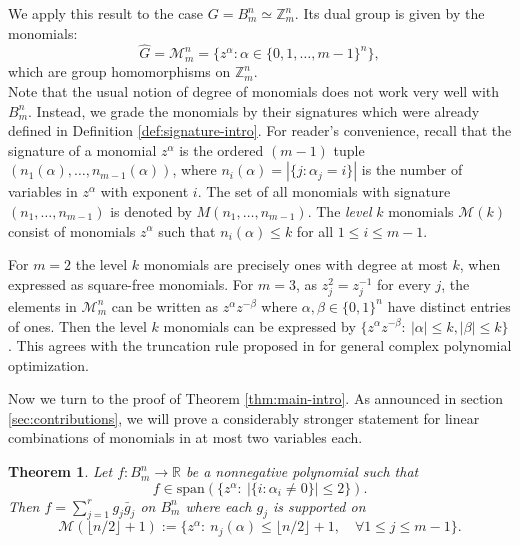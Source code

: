 \documentclass{article}
\newcommand{\ZZ}{\mathbb{Z}}
\newcommand{\RR}{\mathbb{R}}
\newtheorem{theorem}{Theorem}
\theoremstyle{definition}
\newcommand{\Mon}{\mathcal{M}}
\newcommand{\kMon}[1]{\mathcal{M}(#1)}
\begin{document}
We apply this result to the case $G=B_m^n\simeq \ZZ_m^n$. Its dual group is given by the monomials:
$$\hat{G} = \Mon_m^n =\{z^\alpha: \alpha \in \{0,1,\dots,m-1\}^n\},$$ 
which are group homomorphisms on $\ZZ_m^n$. \\
Note that the usual notion of degree of monomials does not work very well with $B_m^n$. Instead, we grade the monomials by their signatures which were already defined in Definition \ref{def:signature-intro}. For reader's convenience, recall that the signature of a monomial $z^\alpha$ is the ordered $(m-1)$ tuple $(n_1(\alpha),\ldots,n_{m-1}(\alpha))$, where $n_i(\alpha)=|\{j:\alpha_j=i\}|$ is the number of variables in $z^\alpha$ with exponent $i$. The set of all monomials with signature $(n_1,\ldots,n_{m-1})$ is denoted by $M(n_1,\ldots,n_{m-1})$. The \emph{level} $k$ monomials $\kMon{k}$ consist of monomials $z^\alpha$ such that $n_i(\alpha)\le k$ for all $1\le i\le m-1$. 

For $m=2$ the level $k$ monomials are precisely ones with degree at most $k$, when expressed as square-free monomials. For $m=3$, as $z_j^2=z_j^{-1}$ for every $j$, the elements in $\Mon_m^n$ can be written as $z^\alpha z^{-\beta}$ where $\alpha,\beta\in \{0,1\}^n$ have distinct entries of ones. Then the level $k$ monomials can be expressed by $\{z^\alpha z^{-\beta}:~|\alpha|\le k,|\beta|\le k\}$. This agrees with the truncation rule proposed in \cite{josz2018lasserre} for general complex polynomial optimization. 


Now we turn to the proof of Theorem \ref{thm:main-intro}. As announced in section \ref{sec:contributions}, we will prove a considerably stronger statement for linear combinations of monomials in at most two variables each. 

\begin{theorem}\label{thm:main}
    Let $f:B_m^n\to\RR$ be a nonnegative polynomial such that 
    \[
    f\in\text{span}(\{z^\alpha:~ |\{i:\alpha_i\ne 0\}|\le 2\}).
    \]
    Then $f=\sum_{j=1}^r g_j \bar{g}_j$ on $B_m^n$ where each $g_j$ is supported on
    \[
    \kMon{\lfloor n/2\rfloor+1}:=\{z^\alpha:~ n_j(\alpha)\le \lfloor n/2\rfloor+1,\quad \forall 1\le j\le m-1\}.
    \]
\end{theorem}
\end{document}
